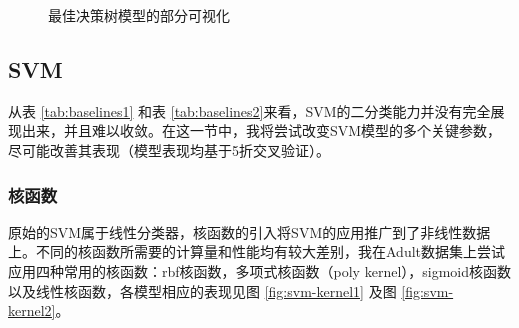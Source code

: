 \documentclass[12pt,a4paper]{article}
\theoremstyle{definition}
\begin{document}
\begin{figure}[H]
	\centering
	\caption{最佳决策树模型的部分可视化}
	\label{fig:dt-best-vis}
\end{figure}

\subsection{SVM}

从表 \ref{tab:baselines1} 和表 \ref{tab:baselines2}来看，SVM的二分类能力并没有完全展现出来，并且难以收敛。在这一节中，我将尝试改变SVM模型的多个关键参数，尽可能改善其表现（模型表现均基于5折交叉验证）。

\subsubsection{核函数}

原始的SVM属于线性分类器，核函数的引入将SVM的应用推广到了非线性数据上。不同的核函数所需要的计算量和性能均有较大差别，我在Adult数据集上尝试应用四种常用的核函数：rbf核函数，多项式核函数（poly kernel），sigmoid核函数以及线性核函数，各模型相应的表现见图 \ref{fig:svm-kernel1} 及图 \ref{fig:svm-kernel2}。
\end{document}
